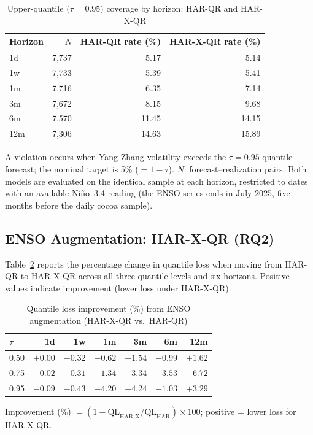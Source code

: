 \begin{table}[htbp]
\centering
\small
\caption{Upper-quantile ($\tau = 0.95$) coverage by horizon: HAR-QR and HAR-X-QR}
\label{tab:upper-coverage}
\begin{tabular}{lrrr}
\toprule
Horizon & $N$ & HAR-QR rate (\%) & HAR-X-QR rate (\%) \\
\midrule
1d  & 7,737 & 5.17 & 5.14 \\
1w  & 7,733 & 5.39 & 5.41 \\
1m  & 7,716 & 6.35 & 7.14 \\
3m  & 7,672 & 8.15 & 9.68 \\
6m  & 7,570 & 11.45 & 14.15 \\
12m & 7,306 & 14.63 & 15.89 \\
\bottomrule
\end{tabular}
\par\smallskip
{\footnotesize A violation occurs when Yang-Zhang volatility exceeds the $\tau = 0.95$ quantile forecast; the nominal target is 5\% ($= 1 - \tau$). $N$: forecast--realization pairs. Both models are evaluated on the identical sample at each horizon, restricted to dates with an available Ni\~no~3.4 reading (the ENSO series ends in July 2025, five months before the daily cocoa sample).}
\end{table}

\subsection{ENSO Augmentation: HAR-X-QR (RQ2)}
\label{sec:res-har-x-qr}

Table~\ref{tab:har-x-improvement} reports the percentage change in quantile
loss when moving from HAR-QR to HAR-X-QR across all three quantile levels
and six horizons. Positive values indicate improvement (lower loss under
HAR-X-QR).

\begin{table}[htbp]
\centering
\small
\caption{Quantile loss improvement (\%) from ENSO augmentation (HAR-X-QR
vs.\ HAR-QR)}
\label{tab:har-x-improvement}
\begin{tabular}{lrrrrrr}
\toprule
$\tau$ & 1d & 1w & 1m & 3m & 6m & 12m \\
\midrule
0.50 & $+0.00$ & $-0.32$ & $-0.62$ & $-1.54$ & $-0.99$ & $+1.62$ \\
0.75 & $-0.02$ & $-0.31$ & $-1.34$ & $-3.34$ & $-3.53$ & $-6.72$ \\
0.95 & $-0.09$ & $-0.43$ & $-4.20$ & $-4.24$ & $-1.03$ & $+3.29$ \\
\bottomrule
\end{tabular}
\par\smallskip
{\footnotesize Improvement (\%) $= (1 - \text{QL}_{\text{HAR-X}} / \text{QL}_{\text{HAR}}) \times 100$; positive = lower loss for HAR-X-QR.}
\end{table}

